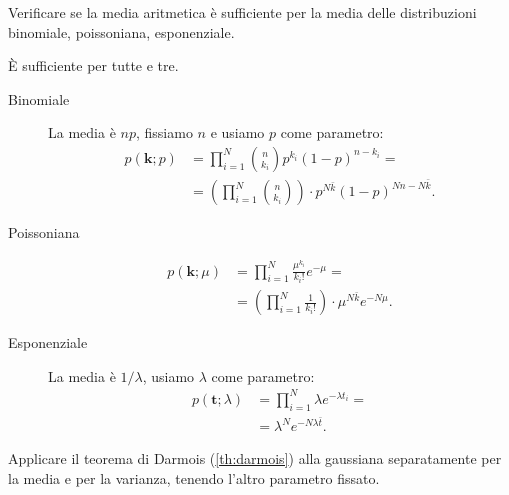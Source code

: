 \begin{exercise}
	Verificare se la media aritmetica è sufficiente per la media delle distribuzioni
	binomiale,
	poissoniana,
	esponenziale.
\end{exercise}

\begin{solution}
	È sufficiente per tutte e tre.
	\begin{description}
		\item[Binomiale]
		La media è $np$, fissiamo $n$ e usiamo $p$ come parametro:
		\begin{align*}
			p(\mathbf k;p)
			&= \prod_{i=1}^N \binom{n}{k_i} p^{k_i} (1-p)^{n-k_i} = \\
			&= \left( \prod_{i=1}^N \binom{n}{k_i} \right) \cdot
			p^{N\bar k} (1-p)^{Nn-N\bar k}.
		\end{align*}
		\item[Poissoniana]
		\begin{align*}
			p(\mathbf k;\mu)
			&= \prod_{i=1}^N \frac{\mu^{k_i}}{k_i!}e^{-\mu} = \\
			&= \left( \prod_{i=1}^N \frac1{k_i!} \right) \cdot \mu^{N\bar k} e^{-N\mu}.
		\end{align*}
		\item[Esponenziale]
		La media è $1/\lambda$, usiamo $\lambda$ come parametro:
		\begin{align*}
			p(\mathbf t;\lambda)
			&= \prod_{i=1}^N \lambda e^{-\lambda t_i} = \\
			&= \lambda^N e^{-N\lambda\bar t}.
		\end{align*}
	\end{description}
\end{solution}

\begin{exercise}
	Applicare il teorema di Darmois (\autoref{th:darmois}) alla gaussiana separatamente per la media e per la varianza,
    tenendo l'altro parametro fissato.
\end{exercise}

